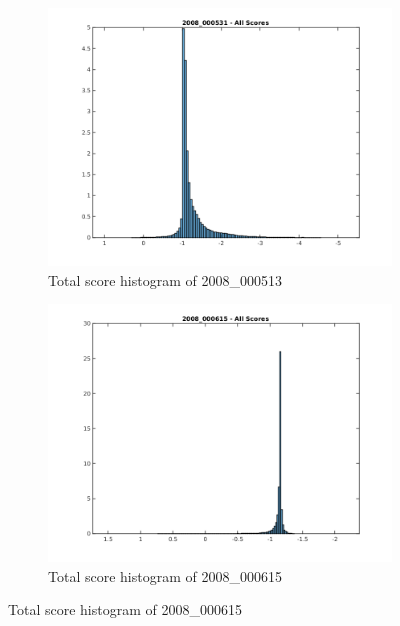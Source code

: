 \begin{figure}
\begin{subfigure}{0.5\textwidth}
\includegraphics[width=\textwidth]{images/2008_000513_all.png}
\caption{Total score histogram of 2008\_000513}
\end{subfigure}%
\begin{subfigure}{0.5\textwidth}
\includegraphics[width=\textwidth]{images/2008_000615_all.png}
\caption{Total score histogram of 2008\_000615}
\end{subfigure}


\end{figure}
